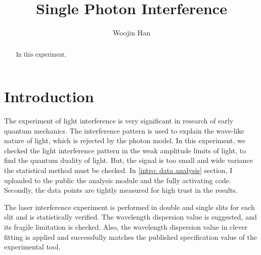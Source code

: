 \documentclass{article}
\begin{document}
\title{Single Photon Interference}
\author[1]{Woojin Han}
\maketitle

\begin{abstract}
    In this experiment,

\end{abstract}
\section{Introduction}
 The experiment of light interference is very significant in research of early quantum mechanics.
The interference pattern is used to explain the wave-like nature of light, which is rejected by the photon model.
In this experiment, we checked the light interference pattern in the weak amplitude limits of light, to find the quantum duality of light.
But, the signal is too small and wide variance the statistical method must be checked.
In \ref{intro: data analysis} section, I uploaded to the public the analysis module and the fully activating code.
Secondly, the data points are tightly measured for high trust in the results.

The laser interference experiment is performed in double and single slits for each slit and is statistically verified.
The wavelength dispersion value is suggested, and its fragile limitation is checked.
Also, the wavelength dispersion value in clever fitting is applied and successfully matches the published specification value of the experimental tool.
\end{document}
